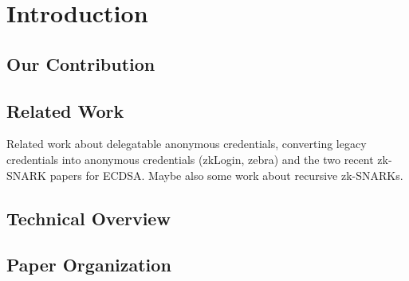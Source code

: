 \section{Introduction}



\subsection{Our Contribution}

\subsection{Related Work}
Related work about delegatable anonymous credentials, converting legacy credentials into anonymous credentials (zkLogin, zebra) and the two recent zk-SNARK papers for ECDSA.
Maybe also some work about recursive zk-SNARKs.
\cite{flamini2025multi}

\subsection{Technical Overview}


\subsection{Paper Organization}